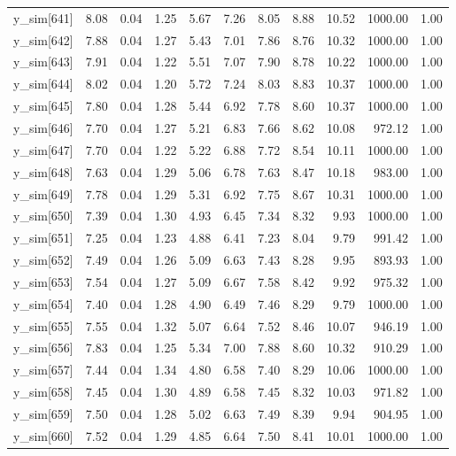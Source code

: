 \begin{table}[ht]
\begin{tabular}{rrrrrrrrrrr}
  y\_sim[641] & 8.08 & 0.04 & 1.25 & 5.67 & 7.26 & 8.05 & 8.88 & 10.52 & 1000.00 & 1.00 \\ 
  y\_sim[642] & 7.88 & 0.04 & 1.27 & 5.43 & 7.01 & 7.86 & 8.76 & 10.32 & 1000.00 & 1.00 \\ 
  y\_sim[643] & 7.91 & 0.04 & 1.22 & 5.51 & 7.07 & 7.90 & 8.78 & 10.22 & 1000.00 & 1.00 \\ 
  y\_sim[644] & 8.02 & 0.04 & 1.20 & 5.72 & 7.24 & 8.03 & 8.83 & 10.37 & 1000.00 & 1.00 \\ 
  y\_sim[645] & 7.80 & 0.04 & 1.28 & 5.44 & 6.92 & 7.78 & 8.60 & 10.37 & 1000.00 & 1.00 \\ 
  y\_sim[646] & 7.70 & 0.04 & 1.27 & 5.21 & 6.83 & 7.66 & 8.62 & 10.08 & 972.12 & 1.00 \\ 
  y\_sim[647] & 7.70 & 0.04 & 1.22 & 5.22 & 6.88 & 7.72 & 8.54 & 10.11 & 1000.00 & 1.00 \\ 
  y\_sim[648] & 7.63 & 0.04 & 1.29 & 5.06 & 6.78 & 7.63 & 8.47 & 10.18 & 983.00 & 1.00 \\ 
  y\_sim[649] & 7.78 & 0.04 & 1.29 & 5.31 & 6.92 & 7.75 & 8.67 & 10.31 & 1000.00 & 1.00 \\ 
  y\_sim[650] & 7.39 & 0.04 & 1.30 & 4.93 & 6.45 & 7.34 & 8.32 & 9.93 & 1000.00 & 1.00 \\ 
  y\_sim[651] & 7.25 & 0.04 & 1.23 & 4.88 & 6.41 & 7.23 & 8.04 & 9.79 & 991.42 & 1.00 \\ 
  y\_sim[652] & 7.49 & 0.04 & 1.26 & 5.09 & 6.63 & 7.43 & 8.28 & 9.95 & 893.93 & 1.00 \\ 
  y\_sim[653] & 7.54 & 0.04 & 1.27 & 5.09 & 6.67 & 7.58 & 8.42 & 9.92 & 975.32 & 1.00 \\ 
  y\_sim[654] & 7.40 & 0.04 & 1.28 & 4.90 & 6.49 & 7.46 & 8.29 & 9.79 & 1000.00 & 1.00 \\ 
  y\_sim[655] & 7.55 & 0.04 & 1.32 & 5.07 & 6.64 & 7.52 & 8.46 & 10.07 & 946.19 & 1.00 \\ 
  y\_sim[656] & 7.83 & 0.04 & 1.25 & 5.34 & 7.00 & 7.88 & 8.60 & 10.32 & 910.29 & 1.00 \\ 
  y\_sim[657] & 7.44 & 0.04 & 1.34 & 4.80 & 6.58 & 7.40 & 8.29 & 10.06 & 1000.00 & 1.00 \\ 
  y\_sim[658] & 7.45 & 0.04 & 1.30 & 4.89 & 6.58 & 7.45 & 8.32 & 10.03 & 971.82 & 1.00 \\ 
  y\_sim[659] & 7.50 & 0.04 & 1.28 & 5.02 & 6.63 & 7.49 & 8.39 & 9.94 & 904.95 & 1.00 \\ 
  y\_sim[660] & 7.52 & 0.04 & 1.29 & 4.85 & 6.64 & 7.50 & 8.41 & 10.01 & 1000.00 & 1.00 \\ 

\end{tabular}
\end{table}

